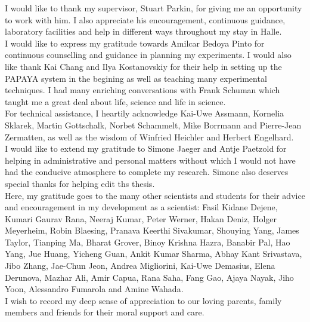 
I would like to thank my supervisor, Stuart Parkin, for
giving me an opportunity to work with him. I also appreciate his
encouragement, continuous guidance, laboratory facilities and help in different ways
throughout my stay in Halle.
\\
I would like to express my gratitude towards Amilcar Bedoya Pinto for continuous
counselling and guidance in planning my experiments. I would also like thank Kai Chang
and Ilya Kostanovskiy for their help in setting up the PAPAYA system in the begining
as well as teaching many experimental techniques. I had many enriching conversations 
with Frank Schuman which taught me a great deal about life, science and life in science.
\\
For technical assistance, I heartily acknowledge Kai-Uwe Assmann, Kornelia Sklarek, 
Martin Gottschalk, Norbet Schammelt, Mike Borrmann and Pierre-Jean Zermatten, 
as well as the wisdom of Winfried Heichler and Herbert Engelhard.
\\
I would like to extend my gratitude to Simone Jaeger and Antje Paetzold for helping
in administrative and personal matters without which I would not have had the conducive atmosphere
to complete my research. Simone also deserves special thanks for helping edit ths thesis.
\\
Here, my gratitude goes to the many 
other scientists and students for their advice and encouragement in
my development as a scientist: Fasil Kidane Dejene, Kumari Gaurav Rana, Neeraj Kumar, Peter 
Werner, Hakan Deniz, Holger Meyerheim, Robin Blaesing, Pranava Keerthi Sivakumar, Shouying 
Yang, James Taylor, Tianping Ma, Bharat Grover, Binoy 
Krishna Hazra, Banabir Pal, Hao Yang, Jue Huang, Yicheng Guan, Ankit Kumar Sharma, Abhay 
Kant Srivastava, Jibo Zhang, Jae-Chun Jeon, Andrea Migliorini, Kai-Uwe Demasius, Elena 
Derunova, Mazhar Ali, Amir Capua, Rana Saha, Fang Gao, Ajaya Nayak, Jiho Yoon, 
Alessandro Fumarola and Amine Wahada.
\\
I wish to record my deep sense of appreciation to our loving parents, family members and friends
for their moral support and care.